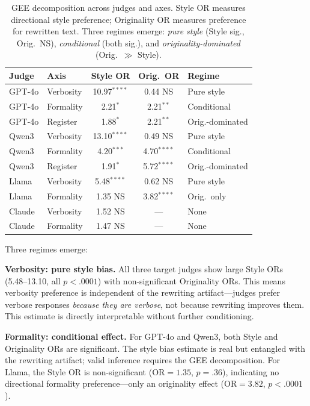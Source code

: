 \documentclass[11pt,a4paper]{article}
\newcommand{\oR}{\text{OR}}
\begin{document}
\begin{table}[t]
\centering
\small
\caption{GEE decomposition across judges and axes. Style OR measures directional style preference; Originality OR measures preference for rewritten text. Three regimes emerge: \textit{pure style} (Style sig., Orig.\ NS), \textit{conditional} (both sig.), and \textit{originality-dominated} (Orig.\ $\gg$ Style).}
\label{tab:gee}
\begin{tabular}{llccl}
\toprule
\textbf{Judge} & \textbf{Axis} & \textbf{Style OR} & \textbf{Orig.\ OR} & \textbf{Regime} \\
\midrule
GPT-4o  & Verbosity  & 10.97$^{****}$ & 0.44 NS    & Pure style \\
GPT-4o  & Formality  & 2.21$^{*}$     & 2.21$^{**}$ & Conditional \\
GPT-4o  & Register   & 1.88$^{*}$     & 2.21$^{**}$ & Orig.-dominated \\
\midrule
Qwen3   & Verbosity  & 13.10$^{****}$ & 0.49 NS    & Pure style \\
Qwen3   & Formality  & 4.20$^{***}$   & 4.70$^{****}$ & Conditional \\
Qwen3   & Register   & 1.91$^{*}$     & 5.72$^{****}$ & Orig.-dominated \\
\midrule
Llama   & Verbosity  & 5.48$^{****}$ & 0.62 NS     & Pure style \\
Llama   & Formality  & 1.35 NS       & 3.82$^{****}$ & Orig.\ only \\
\midrule
Claude  & Verbosity  & 1.52 NS       & ---          & None \\
Claude  & Formality  & 1.47 NS       & ---          & None \\
\bottomrule
\end{tabular}
\end{table}

Three regimes emerge:

\textbf{Verbosity: pure style bias.} All three target judges show large Style ORs (5.48--13.10, all $p < .0001$) with non-significant Originality ORs. This means verbosity preference is independent of the rewriting artifact---judges prefer verbose responses \emph{because they are verbose}, not because rewriting improves them. This estimate is directly interpretable without further conditioning.

\textbf{Formality: conditional effect.} For GPT-4o and Qwen3, both Style and Originality ORs are significant. The style bias estimate is real but entangled with the rewriting artifact; valid inference requires the GEE decomposition. For Llama, the Style OR is non-significant ($\oR = 1.35$, $p = .36$), indicating no directional formality preference---only an originality effect ($\oR = 3.82$, $p < .0001$).
\end{document}

